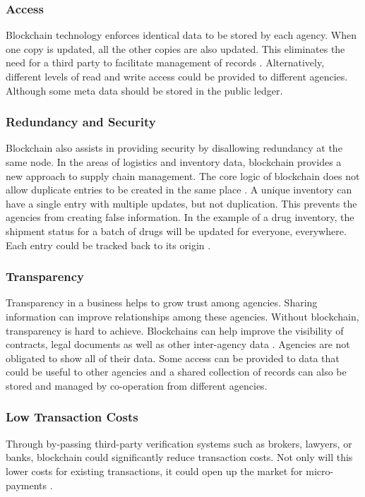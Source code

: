 \documentclass[sigconf]{acmart}
\begin{document}
\subsubsection{Access} Blockchain technology enforces identical data to be stored by each agency. When one copy is updated, all the other copies are also updated. This eliminates the need for a third party to facilitate management of records \cite{arbc3}. Alternatively, different levels of read and write access could be provided to different agencies. Although some meta data should be stored in the public ledger. 

\subsubsection{Redundancy and Security} Blockchain also assists in providing security by disallowing redundancy at the same node. In the areas of logistics and inventory data, blockchain provides a new approach to supply chain management. The core logic of blockchain does not allow duplicate entries to be created in the same place \cite{arbc4}. A unique inventory can have a single entry with multiple updates, but not duplication. This prevents the agencies from creating false information. In the example of a drug inventory, the shipment status for a batch of drugs will be updated for everyone, everywhere. Each entry could be tracked back to its origin \cite{arbc4}. 

\subsubsection{Transparency} Transparency in a business helps to grow trust among agencies. Sharing information can improve relationships among these agencies. Without blockchain, transparency is hard to achieve. Blockchains can help improve the visibility of contracts, legal documents as well as other inter-agency data \cite{pabc1}. Agencies are not obligated to show all of their data. Some access can be provided to data that could be useful to other agencies and a shared collection of records can also be stored and managed by co-operation from different agencies.

\subsubsection{Low Transaction Costs} Through by-passing third-party verification systems such as brokers, lawyers, or banks, blockchain could significantly reduce transaction costs. Not only will this lower costs for existing transactions, it could open up the market for micro-payments \cite{hbr}. 
\end{document}
